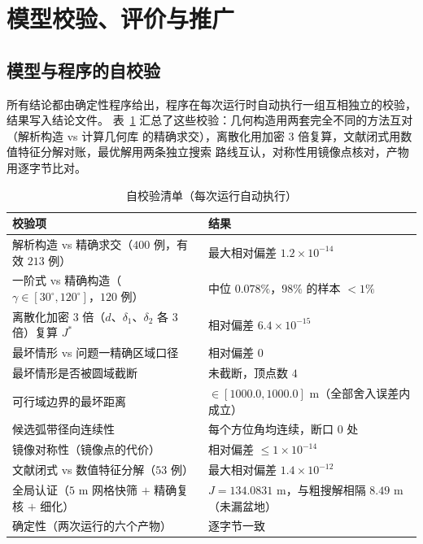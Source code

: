 \section{模型校验、评价与推广}\label{sec:eval}

\subsection{模型与程序的自校验}

所有结论都由确定性程序给出，程序在每次运行时自动执行一组互相独立的校验，结果写入结论文件。
表~\ref{tab:checks} 汇总了这些校验：几何构造用两套完全不同的方法互对（解析构造 vs 计算几何库
的精确求交），离散化用加密 $3$ 倍复算，文献闭式用数值特征分解对账，最优解用两条独立搜索
路线互认，对称性用镜像点核对，产物用逐字节比对。

\begin{table}[H]
  \centering
  \caption{自校验清单（每次运行自动执行）}
  \label{tab:checks}
  \begin{tabular}{p{}p{}}
    \toprule
    \textbf{校验项} & \textbf{结果} \\
    \midrule
    解析构造 vs 精确求交（$400$ 例，有效 $213$ 例） & 最大相对偏差 $1.2\times10^{-14}$ \\
    一阶式 vs 精确构造（$\gamma\in[30^\circ,120^\circ]$，$120$ 例） & 中位 $0.078\%$，$98\%$ 的样本 $<1\%$ \\
    离散化加密 $3$ 倍（$d$、$\delta_1$、$\delta_2$ 各 $3$ 倍）复算 $J^*$ & 相对偏差 $6.4\times10^{-15}$ \\
    最坏情形 vs 问题一精确区域口径 & 相对偏差 $0$ \\
    最坏情形是否被圆域截断 & 未截断，顶点数 $4$ \\
    可行域边界的最坏距离 & $\in[1000.0,1000.0]$ m（全部舍入误差内成立） \\
    候选弧带径向连续性 & 每个方位角均连续，断口 $0$ 处 \\
    镜像对称性（镜像点的代价） & 相对偏差 $\le1\times10^{-14}$ \\
    文献闭式 vs 数值特征分解（$53$ 例） & 最大相对偏差 $1.4\times10^{-12}$ \\
    全局认证（$5$ m 网格快筛 $+$ 精确复核 $+$ 细化） & $J=134.0831$ m，与粗搜解相隔 $8.49$ m（未漏盆地） \\
    确定性（两次运行的六个产物） & 逐字节一致 \\
    \bottomrule
  \end{tabular}
\end{table}

